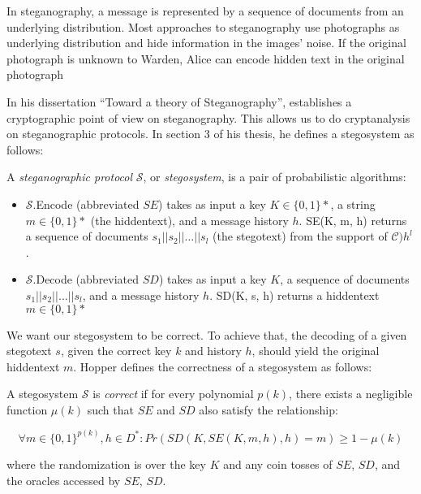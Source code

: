 In steganography, a message is represented by a sequence of documents from an underlying distribution.
Most approaches to steganography use photographs as underlying distribution and hide information in the images' noise.
If the original photograph is unknown to Warden, Alice can encode hidden text in the original photograph

In his dissertation ``Toward a theory of Steganography'', \cite{Hopper2004} establishes a cryptographic point of view on steganography. 
This allows us to do cryptanalysis on steganographic protocols.
In section 3 of his thesis, he defines a stegosystem as follows:

\begin{definition}
\label{def:stegosystem}
A \emph{steganographic protocol} $\mathcal{S}$, or \emph{stegosystem}, is a pair of probabilistic algorithms:

\begin{itemize}
	\item $\mathcal{S}$.Encode (abbreviated $SE$) takes as input a key $K \in \{0,1\}*$, a string $m \in \{0,1\}*$ (the hiddentext), and a message history $h$.
		SE(K, m, h) returns a sequence of documents $s_1||s_2||\dots||s_l$ (the stegotext) from the support of $\mathcal{C})h^l$.
	\item $\mathcal{S}$.Decode (abbreviated $SD$) takes as input a key $K$, a sequence of documents $s_1||s_2||\dots||s_l$, and a message history $h$.
		SD(K, s, h) returns a hiddentext $m \in \{0,1\}*$
\end{itemize}
\end{definition}

We want our stegosystem to be correct.
To achieve that, the decoding of a given stegotext $s$, given the correct key $k$ and history $h$, should yield the original hiddentext $m$.
Hopper defines the correctness of a stegosystem as follows:

\begin{definition}
\label{def:correctness-hopper}
A stegosystem $\mathcal{S}$ is \emph{correct} if for every polynomial $p(k)$, there exists a negligible function $\mu(k)$ such that $SE$ and $SD$ also satisfy the relationship:

$$\forall m \in \{0,1\}^{p(k)}, h \in D^* \colon Pr(SD(K, SE(K, m, h), h) = m) \geq 1 - \mu(k)$$

where the randomization is over the key $K$ and any coin tosses of $SE$, $SD$, and the oracles accessed by $SE$, $SD$.
\end{definition}

